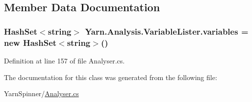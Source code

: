 \subsection{Member Data Documentation}
\hypertarget{a00191_a64ed6c3394c474b6cf5804a35f560746}{
\subsubsection[{variables}]{\setlength{\rightskip}{0pt plus 5cm}Hash\-Set$<$string$>$ Yarn.\-Analysis.\-Variable\-Lister.\-variables = new Hash\-Set$<$string$>$()\hspace{0.3cm}{\ttfamily [private]}}}\label{a00191_a64ed6c3394c474b6cf5804a35f560746}


Definition at line 157 of file Analyser.\-cs.



The documentation for this class was generated from the following file\-:\begin{DoxyCompactItemize}
\item 
Yarn\-Spinner/\hyperlink{a00305}{Analyser.\-cs}\end{DoxyCompactItemize}
